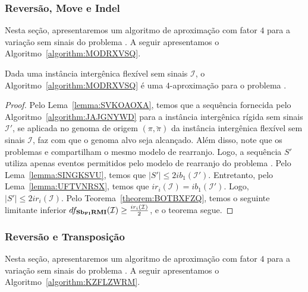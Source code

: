 \subsubsection{Reversão, Move e Indel}

Nesta seção, apresentaremos um algoritmo de aproximação com fator $4$ para a variação sem sinais do problema \SbFIRMI{}. A seguir apresentamos o Algoritmo~\ref{algorithm:MODRXVSQ}.



\begin{theorem}\label{theorem:BSLEJJVB}
Dada uma instância intergênica flexível sem sinais $\mathcal{I}$, o Algoritmo~\ref{algorithm:MODRXVSQ} é uma $4$-aproximação para o problema \SbFIRMI{}.
\end{theorem}
\begin{proof}
Pelo Lema~\ref{lemma:SVKOAOXA}, temos que a sequência fornecida pelo Algoritmo~\ref{algorithm:JAJGNYWD} para a instância intergênica rígida sem sinais $\mathcal{I'}$, se aplicada no genoma de origem $(\pi,\breve\pi)$ da instância intergênica flexível sem sinais $\mathcal{I}$, faz com que o genoma alvo seja alcançado. Além disso, note que os problemas \SbIRMI{} e \SbFIRMI{} compartilham o mesmo modelo de rearranjo. Logo, a sequência $S'$ utiliza apenas eventos permitidos pelo modelo de rearranjo do problema \SbFIRMI{}. Pelo Lema~\ref{lemma:SINGKSVU}, temos que $|S'| \le 2ib_1(\mathcal{I'})$. Entretanto, pelo Lema~\ref{lemma:UFTVNRSX}, temos que $ir_i(\mathcal{I}) = ib_1(\mathcal{I'})$. Logo, $|S'| \le 2ir_i(\mathcal{I})$. Pelo Teorema~\ref{theorem:BOTBXFZQ}, temos o seguinte limitante inferior $df_{\textbf{Sb\textsubscript{FI}RMI}}(\mathcal{I}) \ge \frac{ir_i(\mathcal{I})}{2}$, e o teorema segue.
\end{proof}

\subsubsection{Reversão e Transposição}

Nesta seção, apresentaremos um algoritmo de aproximação com fator $4$ para a variação sem sinais do problema \SbFIRT{}. A seguir apresentamos o Algoritmo~\ref{algorithm:KZFLZWRM}.



